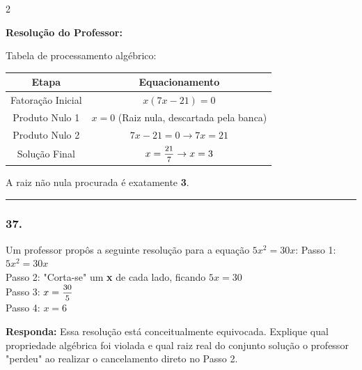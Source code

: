 \begin{multicols*}{2}
\ifgabarito
    \begin{tcolorbox}[colback=CorTitUm!5, colframe=CorTitUm, boxrule=1pt, arc=4pt, left=6pt, right=6pt, top=6pt, bottom=6pt]
    \small\textbf{\textcolor{CorTitUm}{Resolução do Professor:}}\par\vspace{0.1cm}
    \color{CinzaEscuro}
    Tabela de processamento algébrico:
    \vspace{0.1cm}
    \begin{center}
    \begin{tabular}{|c|c|}
    \hline
    \textbf{Etapa} & \textbf{Equacionamento} \\
    \hline
    Fatoração Inicial & $x(7x - 21) = 0$ \\
    \hline
    Produto Nulo 1 & $x = 0$ (Raiz nula, descartada pela banca) \\
    \hline
    Produto Nulo 2 & $7x - 21 = 0 \rightarrow 7x = 21$ \\
    \hline
    Solução Final & $x = \mfrac{21}{7} \rightarrow x = 3$ \\
    \hline
    \end{tabular}
    \end{center}
    \vspace{0.1cm}
    A raiz não nula procurada é exatamente \textbf{3}.
    \end{tcolorbox}
\fi

\par\vspace{\espacoQuestao}

\noindent\textcolor{CorLinha}{\rule{\linewidth}{0.5pt}} 
\par\vspace{\espacoPreQuestao}
\subsubsection*{37.} Um professor propôs a seguinte resolução para a equação $ 5x^2 = 30x $:
Passo 1: $ 5x^2 = 30x $ \\
Passo 2: "Corta-se" um \textbf{x} de cada lado, ficando $ 5x = 30 $ \\
Passo 3: $ x = \mfrac{30}{5} $ \\
Passo 4: $ x = 6 $
\begin{boxresponda}
\textbf{Responda:} Essa resolução está conceitualmente equivocada. Explique qual propriedade algébrica foi violada e qual raiz real do conjunto solução o professor "perdeu" ao realizar o cancelamento direto no Passo 2.
\end{boxresponda}


\end{multicols*}
